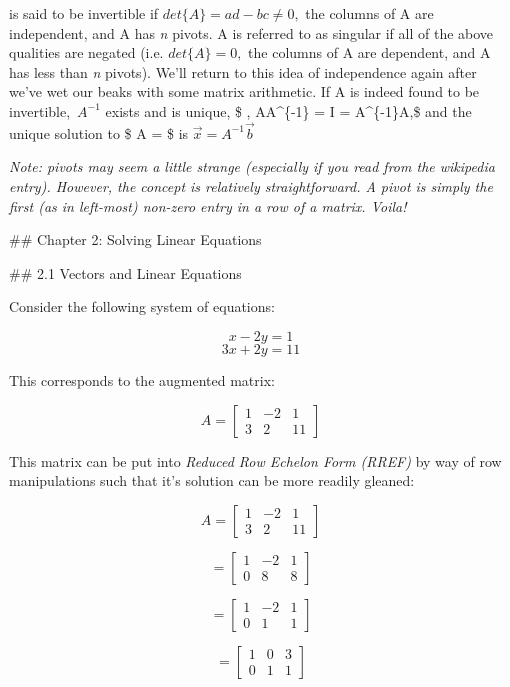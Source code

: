 \documentclass{article}
\begin{document}
is said to be invertible if \(det \{A\} = ad - bc \neq 0,\) the columns
of A are independent, and A has \emph{n} pivots. A is referred to as
singular if all of the above qualities are negated (i.e.
\(det\{A\} = 0,\) the columns of A are dependent, and A has less than
\emph{n} pivots). We'll return to this idea of independence again after
we've wet our beaks with some matrix arithmetic. If A is indeed found to
be invertible, \(\, A^{-1}\) exists and is unique, \$ , AA\^{}\{-1\} = I
= A\^{}\{-1\}A,\$ and the unique solution to \$ A = \$ is
\(\vec{x} = A^{-1} \vec{b}\)

\emph{Note: pivots may seem a little strange (especially if you read
from the wikipedia entry). However, the concept is relatively
straightforward. A pivot is simply the first (as in left-most) non-zero
entry in a row of a matrix. Voila!}

    \#\# Chapter 2: Solving Linear Equations

\#\# 2.1 Vectors and Linear Equations

Consider the following system of equations:

\[x - 2y = 1\] \[3x + 2y = 11\]

This corresponds to the augmented matrix:

\[A = \left[\begin{array}{cc|c} 1 & -2 & 1 \\ 3 & 2 & 11 \end{array}\right] \]

    This matrix can be put into \emph{Reduced Row Echelon Form (RREF)} by
way of row manipulations such that it's solution can be more readily
gleaned:

\[A = \left[\begin{array}{cc|c} 1 & -2 & 1 \\ 3 & 2 & 11 \end{array}\right] \]

\[ = \left[\begin{array}{cc|c} 1 & -2 & 1 \\ 0 & 8 & 8 \end{array}\right]\]

\[ = \left[\begin{array}{cc|c} 1 & -2 & 1 \\ 0 & 1 & 1 \end{array}\right]\]

\[ = \left[\begin{array}{cc|c} 1 & 0 & 3 \\ 0 & 1 & 1 \end{array}\right]\]
\end{document}
